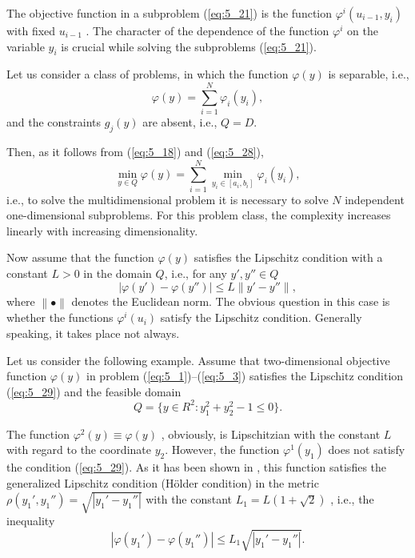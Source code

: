 The objective function in a subproblem (\ref{eq:5_21}) is the function $\varphi^i(u_{i-1},y_i)$  with fixed $u_{i-1}$ . The character of the dependence of the function $\varphi^i$  on the variable $y_i$  is crucial while solving the subproblems (\ref{eq:5_21}).

Let us consider a class of problems, in which the function $\varphi(y)$ is separable, i.e.,
\begin{equation}
\label{eq:5_28}
\varphi(y)=\sum_{i=1}^N{\varphi_i(y_i)},
\end{equation}
and the constraints $g_j(y)$  are absent, i.e., $Q=D$.

Then, as it follows from (\ref{eq:5_18}) and (\ref{eq:5_28}), 
\begin{displaymath}
\min_{y\in Q}\varphi(y)=\sum_{i=1}^N{\min_{y_i\in [a_i,b_i]}\varphi_i(y_i)},
\end{displaymath}
i.e., to solve the multidimensional problem it is necessary to solve $N$ independent one-dimensional subproblems. For this problem class, the complexity increases linearly with increasing dimensionality. 

Now assume that the function $\varphi(y)$ satisfies the Lipschitz condition with a constant $L>0$ in the domain $Q$, i.e., for any $y',y''\in Q$
\begin{equation}
\label{eq:5_29}
\left|\varphi(y')-\varphi(y'')\right|\leq L\left\|y'-y''\right\|,
\end{equation}
where $\left\|\bullet\right\|$ denotes the Euclidean norm. The obvious question in this case is whether the functions $\varphi^i(u_i)$  satisfy the Lipschitz condition. Generally speaking, it takes place not always.

Let us consider the following example. Assume that two-dimensional objective function $\varphi(y)$  in problem (\ref{eq:5_1})--(\ref{eq:5_3}) satisfies the Lipschitz condition (\ref{eq:5_29}) and the feasible domain  
\begin{displaymath}
Q=\{y\in R^2:y_1^2+y_2^2-1\leq 0\}.
\end{displaymath}

The function $\varphi^2(y)\equiv \varphi(y)$ , obviously, is Lipschitzian with the constant $L$ with regard to the coordinate $y_2$. However, the function $\varphi^1(y_1)$  does not satisfy the condition (\ref{eq:5_29}). As it has been shown in \cite{5_StrMonRus}, this function satisfies the generalized Lipschitz condition (H{\"o}lder condition) in the metric $\rho(y_1',y_1'')=\sqrt{\left|y_1'-y_1''\right|}$  with the constant $L_1=L(1+\sqrt{2})$ , i.e., the inequality 
\begin{displaymath}
\left|\varphi(y_1')-\varphi(y_1'')\right|\leq L_1\sqrt{\left|y_1'-y_1''\right|}.
\end{displaymath}

